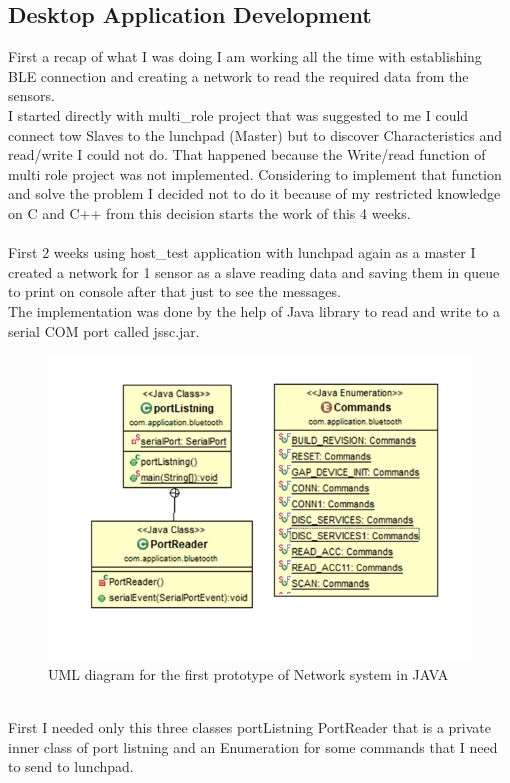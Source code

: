 \documentclass[conference,12pt]{IEEETran}
\begin{document}
\subsection{Desktop Application Development}\cite{vendor}\cite{devguide}\cite{userguide}
First a recap of what I was doing I am working all the time with establishing BLE  connection and creating a network to read the required data from the sensors.\\
I started directly with multi\_role project that was suggested to me I could connect tow Slaves to the lunchpad (Master) but to discover Characteristics and read/write I could not do. That happened because the Write/read function of multi role project was not implemented. Considering to implement that function and solve the problem I decided not to do it because of my restricted knowledge on C and C++ from this decision starts the work of this 4 weeks.\\\\
First 2 weeks using host\_test application with lunchpad again as a master I created a network for 1 sensor as a slave reading data and saving them in queue to print on console after that just to see the messages.\\
The implementation was done by the help of Java library to read and write to a serial COM port called jssc.jar.\\
\begin{figure}[!h]
	\centering
	\includegraphics[scale=0.50]{images/UML1.png}
	\caption{UML diagram for the first prototype of Network system in JAVA}
	\label{img:UML1}
\end{figure}
\\First I needed only this three classes portListning PortReader that is a private inner class of port listning and an Enumeration for some commands that I need to send to lunchpad.\\
\end{document}
